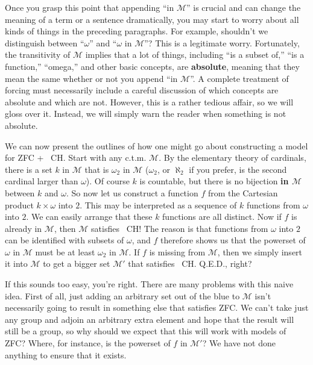 \documentclass[10pt]{article}
\newcommand\axiom[1]{\textmd{#1}}
\theoremstyle{definition}
\theoremstyle{remark}
\begin{document}
Once you grasp this point that appending ``in $\mathcal M$'' is crucial and can change the meaning of a term or a sentence dramatically, you may start to worry about all kinds of things in the preceding paragraphs. For example, shouldn't we distinguish between ``$\omega$'' and ``$\omega$ in $\mathcal M$''? This is a legitimate worry. Fortunately, the transitivity of $\mathcal M$ implies that a lot of things, including ``is a subset of,'' ``is a function,'' ``omega,'' and other basic concepts, are \textbf{absolute}, meaning that they mean the same whether or not you append ``in $\mathcal M$''. A complete treatment of forcing must necessarily include a careful discussion of which concepts are absolute and which are not. However, this is a rather tedious affair, so we will gloss over it. Instead, we will simply warn the reader when something is not absolute.

We can now present the outlines of how one might go about constructing a model for \axiom{ZFC} + \axiom{~CH}. Start with any c.t.m. $\mathcal M$. By the elementary theory of cardinals, there is a set $k$ in $\mathcal M$ that is $\omega_2$ in $\mathcal M$ ($\omega_2$, or $\aleph_2$ if you prefer, is the second cardinal larger than $\omega$). Of course $k$ is countable, but there is no bijection \textbf{in $\mathcal M$} between $k$ and $\omega$. So now let us construct a function $f$ from the Cartesian product $k \times \omega$ into $2$. This may be interpreted as a sequence of $k$ functions from $\omega$ into $2$. We can easily arrange that these $k$ functions are all distinct. Now if $f$ is already in $\mathcal M$, then $\mathcal M$ satisfies \axiom{~CH}! The reason is that functions from $\omega$ into $2$ can be identified with subsets of $\omega$, and $f$ therefore shows us that the powerset of $\omega$ in $\mathcal M$ must be at least $\omega_2$ in $\mathcal M$. If $f$ is missing from $\mathcal M$, then we simply insert it into $\mathcal M$ to get a bigger set $\mathcal{M'}$ that satisfies \axiom{~CH}. Q.E.D., right?

If this sounds too easy, you're right. There are many problems with this naive idea. First of all, just adding an arbitrary set out of the blue to $\mathcal M$ isn't necessarily going to result in something else that satisfies \axiom{ZFC}. We can't take just any group and adjoin an arbitrary extra element and hope that the result will still be a group, so why should we expect that this will work with models of \axiom{ZFC}? Where, for instance, is the powerset of $f$ in $\mathcal{M'}$? We have not done anything to ensure that it exists.
\end{document}
